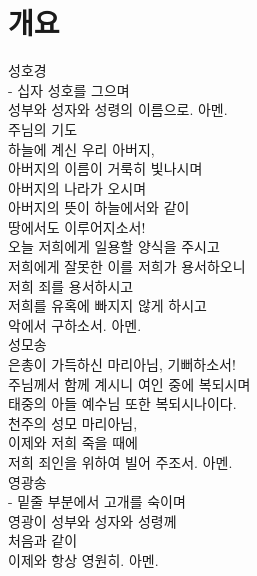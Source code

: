 \section{개요}

성호경\\

- 십자 성호를 그으며\\
성부와 성자와 성령의 이름으로. 아멘.\\


주님의 기도\\

하늘에 계신 우리 아버지,\\
아버지의 이름이 거룩히 빛나시며\\
아버지의 나라가 오시며\\
아버지의 뜻이 하늘에서와 같이\\
땅에서도 이루어지소서!\\
오늘 저희에게 일용할 양식을 주시고\\
저희에게 잘못한 이를 저희가 용서하오니\\
저희 죄를 용서하시고\\
저희를 유혹에 빠지지 않게 하시고\\
악에서 구하소서. 아멘.\\


성모송\\

은총이 가득하신 마리아님, 기뻐하소서!\\
주님께서 함께 계시니 여인 중에 복되시며\\
태중의 아들 예수님 또한 복되시나이다.\\
천주의 성모 마리아님,\\
이제와 저희 죽을 때에\\
저희 죄인을 위하여 빌어 주조서. 아멘.\\



영광송\\

- 밑줄 부분에서 고개를 숙이며\\
영광이 성부와 성자와 성령께\\
처음과 같이\\
이제와 항상 영원히. 아멘.\\


